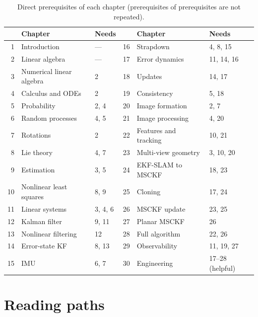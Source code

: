 \begin{table}[h]
\centering\small
\caption{Direct prerequisites of each chapter (prerequisites of prerequisites are not repeated).}
\label{tab:prerequisites}
\begin{tabular}{@{}r l l @{\hspace{8mm}} r l l@{}}
\toprule
& \textbf{Chapter} & \textbf{Needs} & & \textbf{Chapter} & \textbf{Needs} \\
\midrule
1 & Introduction & --- & 16 & Strapdown & 4, 8, 15 \\
2 & Linear algebra & --- & 17 & Error dynamics & 11, 14, 16 \\
3 & Numerical linear algebra & 2 & 18 & Updates & 14, 17 \\
4 & Calculus and ODEs & 2 & 19 & Consistency & 5, 18 \\
5 & Probability & 2, 4 & 20 & Image formation & 2, 7 \\
6 & Random processes & 4, 5 & 21 & Image processing & 4, 20 \\
7 & Rotations & 2 & 22 & Features and tracking & 10, 21 \\
8 & Lie theory & 4, 7 & 23 & Multi-view geometry & 3, 10, 20 \\
9 & Estimation & 3, 5 & 24 & EKF-SLAM to MSCKF & 18, 23 \\
10 & Nonlinear least squares & 8, 9 & 25 & Cloning & 17, 24 \\
11 & Linear systems & 3, 4, 6 & 26 & MSCKF update & 23, 25 \\
12 & Kalman filter & 9, 11 & 27 & Planar MSCKF & 26 \\
13 & Nonlinear filtering & 12 & 28 & Full algorithm & 22, 26 \\
14 & Error-state KF & 8, 13 & 29 & Observability & 11, 19, 27 \\
15 & IMU & 6, 7 & 30 & Engineering & 17--28 (helpful) \\
\bottomrule
\end{tabular}
\end{table}

\section*{Reading paths}

